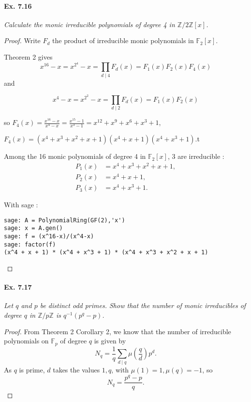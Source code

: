 \documentclass[11pt,a4paper]{article}
\newcommand{\Z}{\mathbb{Z}}
\newcommand{\F}{\mathbb{F}}
\begin{document}
\paragraph{Ex. 7.16}

{\it Calculate the monic irreducible polynomials of degree 4 in $\Z/2\Z[x]$.

}

\begin{proof}
Write $F_d$ the product of irreducible monic polynomials in $\mathbb{F}_2[x]$.

Theorem 2 gives $$x^{16}-x=x^{2^4}-x = \prod\limits_{d\mid 4} F_d(x) = F_1(x) F_2(x) F_4(x)$$ 
and 

$$x^{4}-x=x^{2^2}-x = \prod\limits_{d\mid 2} F_d(x) = F_1(x) F_2(x)$$

so $F_4(x) = \frac{x^{16}-x}{x^4-x} = \frac{x^{15}-1}{x^3-1} = x^{12}+x^9+x^6+x^3+1$,

$F_4(x) = (x^4+x^3+x^2+x+1)(x^4+x+1)(x^4+x^3+1)$.t

Among the 16 monic polynomials of degree 4 in $\mathbb{F}_2[x]$, 3 are irreducible :
\begin{align*}
P_1(x) &= x^4+x^3+x^2+x+1,\\
 P_2(x)&=x^4+x+1,\\
  P_3(x)&=x^4+x^3+1.
\end{align*}

With sage : 
\begin{verbatim}
sage: A = PolynomialRing(GF(2),'x')
sage: x = A.gen()
sage: f = (x^16-x)/(x^4-x)
sage: factor(f)
(x^4 + x + 1) * (x^4 + x^3 + 1) * (x^4 + x^3 + x^2 + x + 1)
\end{verbatim}
\end{proof}

\paragraph{Ex. 7.17}

{\it Let $q$ and $p$ be distinct odd primes. Show that the number of monic irreducibles of degree $q$ in $\Z/p\Z$ is $q^{-1}(p^q -p)$.
}

\begin{proof}
From Theorem 2 Corollary 2, we know that the number of irreducible polynomials on $\F_p$ of degree $q$ is given by
$$N_q = \frac{1}{q}\sum_{d\mid q} \mu\left(\frac{q}{d}\right) p^d.$$
As $q$ is prime, $d$ takes the values $1,q$, with $\mu(1) = 1, \mu(q) = -1$, so
$$N_q = \frac{p^q -p}{q}.$$
\end{proof}
\end{document}
